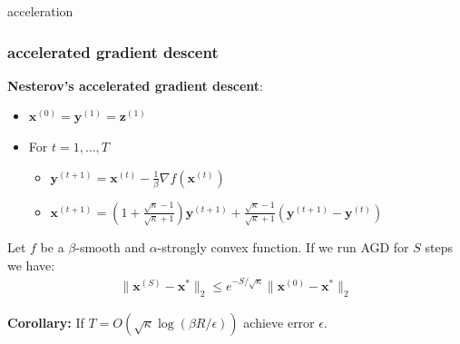 \documentclass[compress]{beamer}
\newcommand{\bv}[1]{\mathbf{#1}}
\newcommand{\R}{\mathbb{R}}
\begin{document}
\begin{frame}[standout]
	\begin{center}
		\large acceleration
	\end{center}
\end{frame}


\begin{frame}
	\frametitle{accelerated gradient descent}
	\textbf{Nesterov's accelerated gradient descent}:
	\begin{itemize}
		\item $\bv{x}^{(0)} = \bv{y}^{(1)} = \bv{z}^{(1)}$  
		\item For $t = 1,\ldots, T$
		\begin{itemize}
			\item $\bv{y}^{(t+1)} = \bv{x}^{(t)} - \frac{1}{\beta}\nabla f(\bv{x}^{(t)})$
			\item $\bv{x}^{(t+1)} = \left(1 + \frac{\sqrt{\kappa} - 1}{\sqrt{\kappa} + 1}\right) \bv{y}^{(t+1)} + \frac{\sqrt{\kappa} - 1}{\sqrt{\kappa} + 1}\left(\bv{y}^{(t+1)} - \bv{y}^{(t)}\right)$
		\end{itemize}
	\end{itemize}
	\begin{theorem}
		Let $f$ be a $\beta$-smooth and $\alpha$-strongly convex function. If we run AGD for $S$ steps we have:
		\begin{align*}
			\|\bv{x}^{(S)} - \bv{x}^*\|_2 \leq  e^{-S/\sqrt{\kappa}} \|\bv{x}^{(0)} - \bv{x}^*\|_2
		\end{align*} 
	\end{theorem}	
	\textbf{Corollary:} If \alert{$T = O\left(\sqrt{\kappa}\log(\beta R/\epsilon)\right)$ achieve error $\epsilon$.} 
	
\end{frame}
%
%		
%		
%		
%
\end{document}

